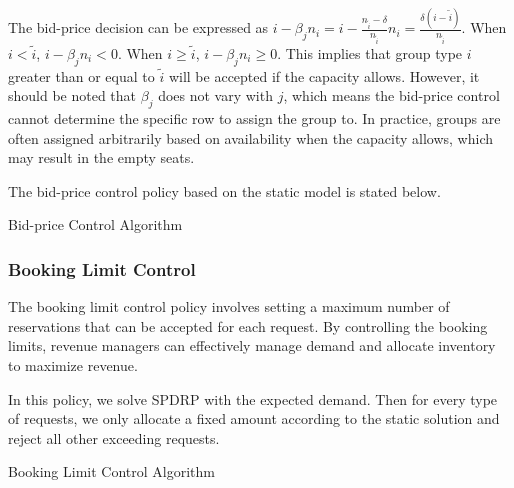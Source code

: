 The bid-price decision can be expressed as $i - \beta_j n_i = i - \frac{n_{\tilde{i}} - \delta}{n_{\tilde{i}}} n_i = \frac{\delta (i - \tilde{i})}{n_{\tilde{i}}}$. When $i < \tilde{i}$, $i - \beta_j n_i < 0$. When $i \geq \tilde{i}$, $i - \beta_j n_i \geq 0$. This implies that group type $i$ greater than or equal to $\tilde{i}$ will be accepted if the capacity allows. However, it should be noted that $\beta_j$ does not vary with $j$, which means the bid-price control cannot determine the specific row to assign the group to. In practice, groups are often assigned arbitrarily based on availability when the capacity allows, which may result in the empty seats.

The bid-price control policy based on the static model is stated below.

\begin{algorithm}[H]
  \caption{Bid-price Control Algorithm}\label{algo_bid}
\end{algorithm}


\subsubsection*{Booking Limit Control}
The booking limit control policy involves setting a maximum number of reservations that can be accepted for each request. By controlling the booking limits, revenue managers can effectively manage demand and allocate inventory to maximize revenue.

In this policy, we solve SPDRP with the expected demand. Then for every type of requests, we only allocate a fixed amount according to the static solution and reject all other exceeding requests. 



\begin{algorithm}[H]
  \caption{Booking Limit Control Algorithm}\label{algo_booking}
\end{algorithm}


